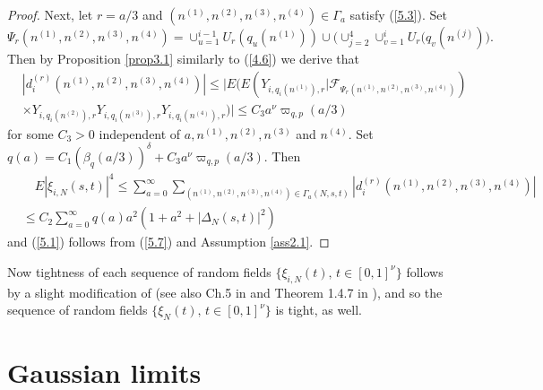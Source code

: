 \begin{proof}
Next, let $r=a/3$ and $(n^{(1)},n^{(2)},n^{(3)},n^{(4)})\in{{\Gamma}}_a$ satisfy
(\ref{5.3}). Set
\[
\Psi_r(n^{(1)},n^{(2)},n^{(3)},n^{(4)})=\cup_{u=1}^{i-1}U_r(q_u(n^{(1)}))
\cup\big(\cup_{j=2}^4\cup_{v=1}^iU_r(q_v(n^{(j)})\big).
\]
Then by Proposition \ref{prop3.1} similarly to (\ref{4.6}) we derive that
\begin{eqnarray}\label{5.6}
&|d_i^{(r)}(n^{(1)},n^{(2)},n^{(3)},n^{(4)})|\leq\big\vert E\big( E(Y_{i,
q_i(n^{(1)}),r}|{{\mathcal F}}_{\Psi_r(n^{(1)},n^{(2)},n^{(3)},n^{(4)})})\\
&\times Y_{i,q_i(n^{(2)}),r}Y_{i,q_i(n^{(3)}),r}Y_{i,q_i(n^{(4)}),r}\big)
\big\vert\leq C_3a^\nu{{\varpi}}_{q,p}(a/3)\nonumber
\end{eqnarray}
for some $C_3>0$ independent of $a,n^{(1)},n^{(2)},n^{(3)}$ and $n^{(4)}$.
Set $q(a)=C_1({{\beta}}_q(a/3))^{{\delta}}+C_3a^\nu{{\varpi}}_{q,p}(a/3)$. Then
\begin{eqnarray}\label{5.7}
&\quad E|\xi_{i,N}(s,t)|^4\leq\sum_{a=0}^\infty\sum_{(n^{(1)},n^{(2)},n^{(3)},
n^{(4)})\in{{\Gamma}}_a(N,s,t)}|d_i^{(r)}(n^{(1)},n^{(2)},n^{(3)},n^{(4)})|\\
&\leq C_2\sum_{a=0}^\infty q(a)a^2(1+a^2+|{{\Delta}}_N(s,t)|^2)\nonumber
\end{eqnarray}
and (\ref{5.1}) follows from (\ref{5.7}) and Assumption \ref{ass2.1}.
\end{proof}

Now tightness of each sequence of random fields $\{ \xi_{i,N}(t),\, 
t\in[0,1]^\nu\}$ follows by a slight modification of \cite{BW} (see also
Ch.5 in \cite{BS2} and Theorem 1.4.7 in \cite{Ku}), and so
the sequence of random fields $\{ \xi_N(t),\, t\in[0,1]^\nu\}$ is tight,
as well.

\section{Gaussian limits}\label{sec6}\setcounter{equation}{0}

